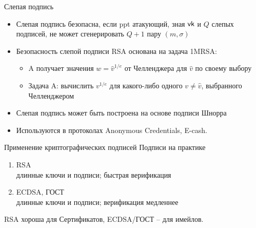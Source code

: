 \documentclass[usenames,dvipsnames,8pt,aspectratio=169]{beamer}
\begin{document}
\begin{frame}{Слепая подпись }

\Large

\begin{itemize}
	\itemsep10pt
	\item Слепая подпись безопасна, если ppt атакующий, зная $\textsf{vk}$ и $Q$ слепых подписей, не может сгенерировать $Q+1$ пару  $(m, \sigma)$
	\item Безопасность слепой подписи RSA основана на задача 1MRSA: \\
	\begin{itemize}
		\itemsep5pt
		\large 
		\item {\color{Orange} A} получает значения $w = \hat{v}^{1/e}$ от Челленджера для $\hat{v}$ по своему выбору
		\item Задача {\color{Orange} A}: вычислить $v^{1/e}$ для какого-либо одного $v \neq \hat{v}$, выбранного Челленджером
	\end{itemize}	
	
	\item Слепая подпись может быть построена на основе подписи Шнорра
	\item Используются в протоколах Anonymous Credentials, E-cash. 
\end{itemize}


\end{frame}

\begin{frame}{Применение криптографических подписей}
	\Large
	Подписи на практике
	\begin{enumerate}
		\itemsep 10pt
		\item RSA \\
		длинные ключи и подписи; быстрая верификация
		\item ECDSA, ГОСТ\\
		длинные ключи и подписи; верификация медленнее
	\end{enumerate}
\vspace{10pt}
RSA хороша для {\color{Orange} Сертификатов}, ECDSA/ГОСТ -- для имейлов. \\[10pt]


\end{frame}
\end{document}
